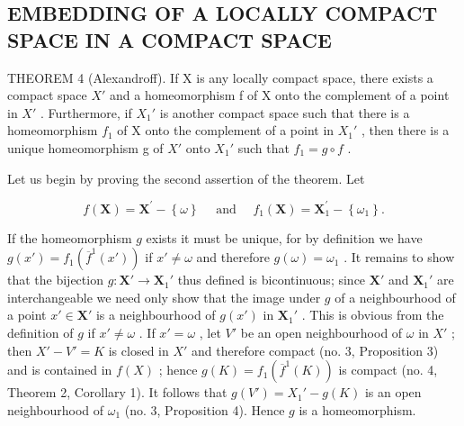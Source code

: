 \subsection{EMBEDDING OF A LOCALLY COMPACT SPACE IN A COMPACT SPACE}

THEOREM 4 (Alexandroff). If X is any locally compact space, there exists a compact space \(X'\) and a homeomorphism f of X onto the complement of a point in \(X'\) . Furthermore, if \(X_{1}'\) is another compact space such that there is a homeomorphism \(f_{1}\) of X onto the complement of a point in \(X_{1}'\) , then there is a unique homeomorphism g of \(X'\) onto \(X_{1}'\) such that \(f_{1}=g\circ f\) .

Let us begin by proving the second assertion of the theorem. Let

\[
f (\mathbf {X}) = \mathbf {X} ^ {\prime} - \left\{\omega \right\} \quad \text { and } \quad f _ {1} (\mathbf {X}) = \mathbf {X} _ {1} ^ {\prime} - \left\{\omega_ {1} \right\}.
\]

If the homeomorphism \(g\) exists it must be unique, for by definition we have \(g(x') = f_1(\overline{f}^1 (x'))\) if \(x' \neq \omega\) and therefore \(g(\omega) = \omega_1\) . It remains to show that the bijection \(g: \mathbf{X}' \to \mathbf{X}_1'\) thus defined is bicontinuous; since \(\mathbf{X}'\) and \(\mathbf{X}_1'\) are interchangeable we need only show that the image under \(g\) of a neighbourhood of a point \(x' \in \mathbf{X}'\) is a neighbourhood of \(g(x')\) in \(\mathbf{X}_1'\) . This is obvious from the definition of \(g\) if \(x' \neq \omega\) . If \(x' = \omega\) , let \(V'\) be an open neighbourhood of \(\omega\) in \(X'\) ; then \(X' - V' = K\) is closed in \(X'\) and therefore compact (no. 3, Proposition 3) and is contained in \(f(X)\) ; hence \(g(K) = f_1(\overline{f}^1 (K))\) is compact (no. 4, Theorem 2, Corollary 1). It follows that \(g(V') = X_1' - g(K)\) is an open neighbourhood of \(\omega_1\) (no. 3, Proposition 4). Hence \(g\) is a homeomorphism.

